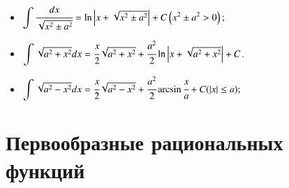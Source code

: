 \documentclass[twoside, a4paperpt]{extarticle}
\begin{document}
\begin{itemize}
    \item $\displaystyle \int \cfrac{d x}{\sqrt{x^{2} \pm a^{2}}}=\ln \left|x+\sqrt{x^{2} \pm a^{2}}\right|+C\left(x^{2} \pm a^{2}>0\right) ;$
    \item $\displaystyle \int \sqrt{a^{2}+x^{2}} d x=\cfrac{x}{2} \sqrt{a^{2}+x^{2}}+\cfrac{a^{2}}{2} \ln \left|x+\sqrt{a^{2}+x^{2}}\right|+C$.
    \item $\displaystyle \int \sqrt{a^{2}-x^{2}} d x=\cfrac{x}{2} \sqrt{a^{2}-x^{2}}+\cfrac{a^{2}}{2} \arcsin \cfrac{x}{a}+C(|x| \leq a) ;$
\end{itemize}

\section*{Первообразные рациональных функций}
\end{document}
